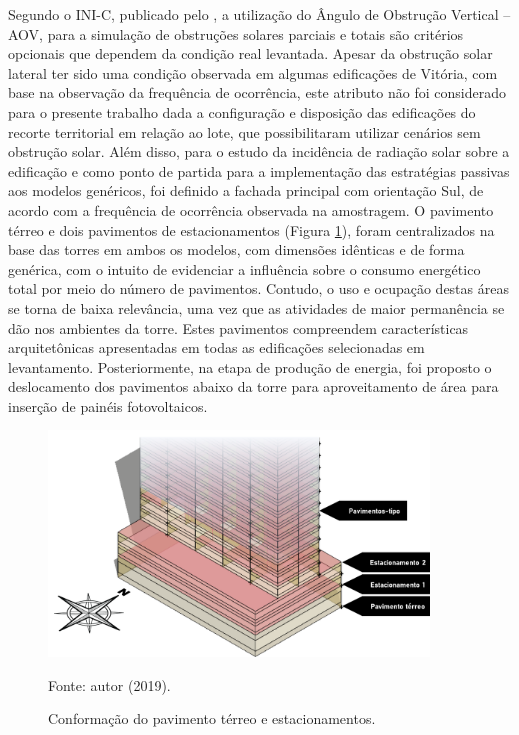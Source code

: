 \noindent Segundo o INI-C, publicado pelo \textcite{InstitutoNacionaldeMetrologiaNormalizacaoeQualidadeIndustrial-INMETRO2018},
a utilização do Ângulo de Obstrução Vertical – AOV, para a simulação de obstruções solares parciais e totais são critérios opcionais que dependem da condição real levantada. Apesar da obstrução solar lateral ter sido uma condição observada em algumas edificações de Vitória, com base na observação da frequência de ocorrência, este atributo não foi considerado para o presente trabalho dada a configuração e disposição das edificações do recorte territorial em relação ao lote, que possibilitaram utilizar cenários sem obstrução solar. Além disso, para o estudo da incidência de radiação solar sobre a edificação e como ponto de partida para a implementação das estratégias passivas aos modelos genéricos, foi definido a fachada principal com orientação Sul, de acordo com a frequência de ocorrência observada na amostragem.\vspace*{0.3cm} \newline
O pavimento térreo e dois pavimentos de estacionamentos (Figura \ref{fig:figura10}), foram centralizados na base das torres em ambos os modelos, com dimensões idênticas e de forma genérica, com o intuito de evidenciar a influência sobre o consumo energético total por meio do número de pavimentos. Contudo, o uso e ocupação destas áreas se torna de baixa relevância, uma vez que as atividades de maior permanência se dão nos ambientes da torre.\vspace*{0.3cm} \newline
Estes pavimentos compreendem características arquitetônicas apresentadas em todas as edificações selecionadas em levantamento. Posteriormente, na etapa de produção de energia, foi proposto o deslocamento dos pavimentos abaixo da torre para aproveitamento de área para inserção de painéis fotovoltaicos.
\begin{figure}[H]
    \centering
    \caption{\small Conformação do pavimento térreo e estacionamentos.}
    \includegraphics[width=0.9\textwidth]{figures/fig12-base_torre-1.png}
    \begin{flushleft}
        \par \small Fonte: autor (2019).
    \end{flushleft}
    \label{fig:figura10}
\end{figure}\vspace*{-0.5cm}
